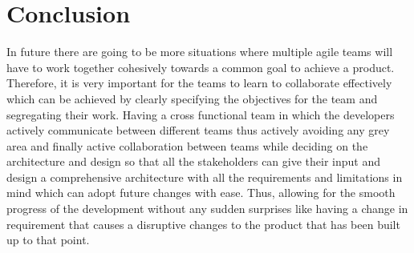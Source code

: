 \documentclass[sigconf]{acmart}
\begin{document}
\section{Conclusion}
In future there are going to be more situations where multiple agile teams will have to work together cohesively towards a common goal to achieve a product. Therefore, it is very important for the teams to learn to collaborate effectively which can be achieved by clearly specifying the objectives for the team and segregating their work. Having a cross functional team in which the developers actively communicate between different teams thus actively avoiding any grey area and finally active collaboration between teams while deciding on the architecture and design so that all the stakeholders can give their input and design a comprehensive architecture with all the requirements and limitations in mind which can adopt future changes with ease. Thus, allowing for the smooth progress of the development without any sudden surprises like having a change in requirement that causes a disruptive changes to the product that has been built up to that point.

%

\end{document}
